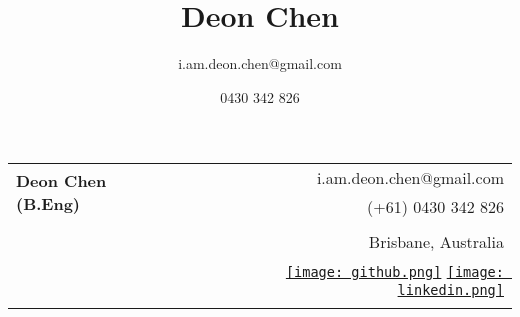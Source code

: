 \documentclass[10pt]{article}
\title{\bfseries\Huge Deon Chen}
\author{i.am.deon.chen@gmail.com}
\date{0430 342 826}
\begin{document}

\thispagestyle{empty}
\begin{tabular}{ p{3cm} p{10cm}|r }
    \multirow{2}{*}{\Huge \textbf{Deon Chen (B.Eng)}} & & i.am.deon.chen@gmail.com \\ 
    & & (+61) 0430 342 826 \\ 
    & & \\
    & & Brisbane, Australia \\
    & & 
    \href{https://zabuzabuzaza.github.io}{\texttt{[image: github.png]}} \quad
    \href{https://www.linkedin.com/in/deon-chen-12737a16a/}{\texttt{[image: linkedin.png]}} 
    \\ \\
\end{tabular}

\vspace{0pt}
\end{document}
